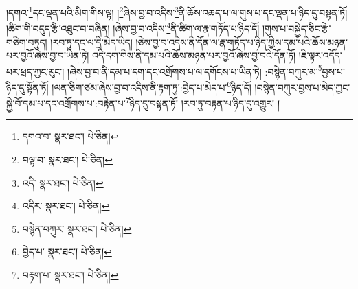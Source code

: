 །དགའ་\footnote{དགའ་བ་  སྣར་ཐང་།  པེ་ཅིན། }དང་ལྡན་པའི་མིག་གིས་ལྟ། །\footnote{བལྟ་བ་  སྣར་ཐང་།  པེ་ཅིན། }ཞེས་བྱ་བ་འདིས་\footnote{འདི་  སྣར་ཐང་།  པེ་ཅིན། }ནི་ཆོས་འཆད་པ་ལ་གུས་པ་དང་ལྡན་པ་ཉིད་དུ་བསྟན་ཏོ། །ཚིག་གི་བདུད་རྩི་འཐུང་བ་བཞིན། །ཞེས་བྱ་བ་འདིས་\footnote{འདིར་  སྣར་ཐང་།  པེ་ཅིན། }ནི་ཚིག་ལ་རྣ་གཏོད་པ་ཉིད་དོ། །གུས་པ་བསྐྱེད་ཅིང་རྩེ་གཅིག་བཏུད། །རབ་ཏུ་དང་ལ་དྲི་མེད་ཡིད། །ཅེས་བྱ་བ་འདིས་ནི་དོན་ལ་རྣ་གཏོད་པ་ཉིད་ཀྱིས་དམ་པའི་ཆོས་མཉན་པར་བྱའོ་ཞེས་བྱ་བ་ཡིན་ཏེ། འདི་དག་གིས་ནི་དམ་པའི་ཆོས་མཉན་པར་བྱའོ་ཞེས་བྱ་བའི་དོན་ཏོ། །ཇི་ལྟར་འདོད་པར་ཕྲད་ཀྱང་རུང་། །ཞེས་བྱ་བ་ནི་དམ་པ་དག་དང་འགྲོགས་པ་ལ་དགོངས་པ་ཡིན་ཏེ། :བསྙེན་བཀུར་མ་\footnote{བསྙེན་བཀུར་  སྣར་ཐང་།  པེ་ཅིན། }བྱས་པ་ཉིད་དུ་སྟོན་ཏོ། །ལན་ཅིག་ཙམ་ཞེས་བྱ་བ་འདིས་ནི་རྟག་ཏུ་:བྱེད་པ་མེད་པ་\footnote{བྱེད་པ་  སྣར་ཐང་།  པེ་ཅིན། }ཉིད་དོ། །བསྙེན་བཀུར་བྱས་པ་མེད་ཀྱང་སྐྱེ་བོ་དམ་པ་དང་འགྲོགས་པ་:བརྟེན་པ་\footnote{བརྟག་པ་  སྣར་ཐང་།  པེ་ཅིན། }ཉིད་དུ་བསྟན་ཏོ། །རབ་ཏུ་བརྟན་པ་ཉིད་དུ་འགྱུར། །
